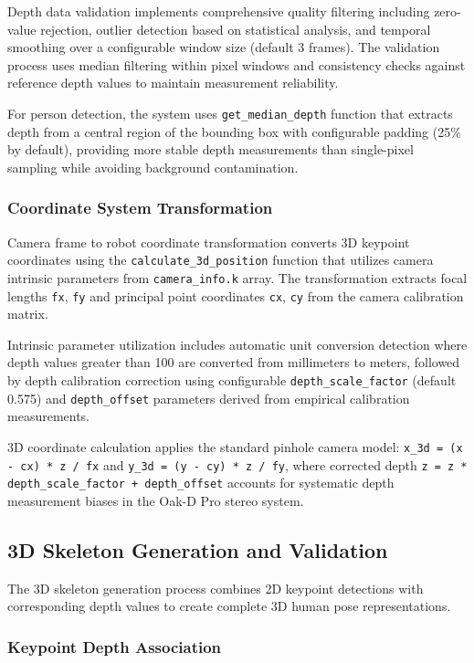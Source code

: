 Depth data validation implements comprehensive quality filtering including zero-value rejection, outlier detection based on statistical analysis, and temporal smoothing over a configurable window size (default 3 frames). The validation process uses median filtering within pixel windows and consistency checks against reference depth values to maintain measurement reliability.

For person detection, the system uses \texttt{get\_median\_depth} function that extracts depth from a central region of the bounding box with configurable padding (25\% by default), providing more stable depth measurements than single-pixel sampling while avoiding background contamination.

\subsubsection{Coordinate System Transformation}

Camera frame to robot coordinate transformation converts 3D keypoint coordinates using the \texttt{calculate\_3d\_position} function that utilizes camera intrinsic parameters from \texttt{camera\_info.k} array. The transformation extracts focal lengths \texttt{fx}, \texttt{fy} and principal point coordinates \texttt{cx}, \texttt{cy} from the camera calibration matrix.

Intrinsic parameter utilization includes automatic unit conversion detection where depth values greater than 100 are converted from millimeters to meters, followed by depth calibration correction using configurable \texttt{depth\_scale\_factor} (default 0.575) and \texttt{depth\_offset} parameters derived from empirical calibration measurements.

3D coordinate calculation applies the standard pinhole camera model: \texttt{x\_3d = (x - cx) * z / fx} and \texttt{y\_3d = (y - cy) * z / fy}, where corrected depth \texttt{z = z * depth\_scale\_factor + depth\_offset} accounts for systematic depth measurement biases in the Oak-D Pro stereo system.

\subsection{3D Skeleton Generation and Validation}

The 3D skeleton generation process combines 2D keypoint detections with corresponding depth values to create complete 3D human pose representations.

\subsubsection{Keypoint Depth Association}

